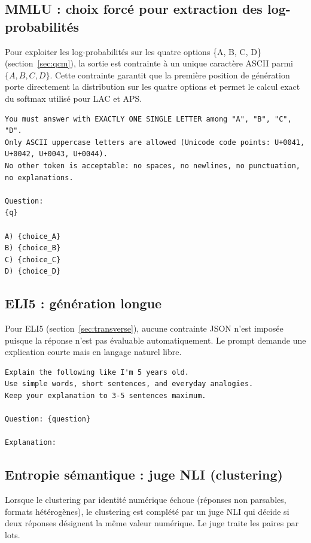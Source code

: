 \documentclass[12pt,a4paper]{article}
\begin{document}
\subsection{MMLU : choix forcé pour extraction des log-probabilités}

Pour exploiter les log-probabilités sur les quatre options \{A, B, C, D\} (section~\ref{sec:qcm}), la sortie est contrainte à un unique caractère ASCII parmi $\{A, B, C, D\}$. Cette contrainte garantit que la première position de génération porte directement la distribution sur les quatre options et permet le calcul exact du softmax utilisé pour LAC et APS.

\begin{verbatim}
You must answer with EXACTLY ONE SINGLE LETTER among "A", "B", "C", "D".
Only ASCII uppercase letters are allowed (Unicode code points: U+0041,
U+0042, U+0043, U+0044).
No other token is acceptable: no spaces, no newlines, no punctuation,
no explanations.

Question:
{q}

A) {choice_A}
B) {choice_B}
C) {choice_C}
D) {choice_D}
\end{verbatim}

\subsection{ELI5 : génération longue}

Pour ELI5 (section~\ref{sec:transverse}), aucune contrainte JSON n'est imposée puisque la réponse n'est pas évaluable automatiquement. Le prompt demande une explication courte mais en langage naturel libre.

\begin{verbatim}
Explain the following like I'm 5 years old.
Use simple words, short sentences, and everyday analogies.
Keep your explanation to 3-5 sentences maximum.

Question: {question}

Explanation:
\end{verbatim}

\subsection{Entropie sémantique : juge NLI (clustering)}

Lorsque le clustering par identité numérique échoue (réponses non parsables, formats hétérogènes), le clustering est complété par un juge NLI qui décide si deux réponses désignent la même valeur numérique. Le juge traite les paires par lots.
\end{document}
